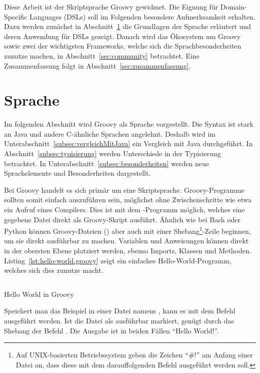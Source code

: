 \documentclass[a4paper]{article}
\newcommand{\outquote}[1]{``{#1}''}
\newcommand{\codelisting}[3]{\begin{listing}[htp]
	\inputminted{#1}{#1/#2}
	\vspace{-3ex}
	\caption{#3}
	\label{lst:#2}
\end{listing}}
\begin{document}
Diese Arbeit ist der Skriptsprache Groovy gewidmet.
Die Eignung für Domain-Specific Languages (DSLs) soll im Folgenden besondere Aufmerksamkeit erhalten.
Dazu werden zunächst in Abschnitt~\ref{sec:sprache} die Grundlagen der Sprache erläutert und deren Anwendung für DSLs gezeigt.
Danach wird das Ökosystem um Groovy sowie zwei der wichtigsten Frameworks, welche sich die Sprachbesonderheiten zunutze machen, in Abschnitt~\ref{sec:community} betrachtet.
Eine Zusammenfassung folgt in Abschnitt~\ref{sec:zusammenfassung}.


\section{Sprache}\label{sec:sprache}

Im folgenden Abschnitt wird Groovy als Sprache vorgestellt.
Die Syntax ist stark an Java und andere C-ähnliche Sprachen angelehnt.
Deshalb wird im Unterabschnitt~\ref{subsec:vergleichMitJava} ein Vergleich mit Java durchgeführt.
In Abschnitt~\ref{subsec:typisierung} werden Unterschiede in der Typisierung betrachtet.
In Unterabschnitt~\ref{subsec:besonderheiten} werden neue Sprachelemente und Besonderheiten dargestellt.

Bei Groovy handelt es sich primär um eine Skriptsprache.
Groovy-Programme sollten somit einfach auszuführen sein, möglichst ohne Zwischenschritte wie etwa ein Aufruf eines Compilers.
Dies ist mit dem -Programm möglich, welches eine gegebene Datei direkt als Groovy-Skript ausführt.
Ähnlich wie bei Bash oder Python können Groovy-Dateien () aber auch mit einer Shebang\footnote{Auf UNIX-basierten Betriebssystem geben die Zeichen ``\#!'' am Anfang einer Datei an, dass diese mit dem darauffolgenden Befehl ausgeführt werden soll.}-Zeile beginnen, um sie direkt ausführbar zu machen.
Variablen und Anweisungen können direkt in der obersten Ebene platziert werden, ebenso Imports, Klassen und Methoden.
Listing~\ref{lst:hello-world.groovy} zeigt ein einfaches Hello-World-Programm, welches sich dies zunutze macht.

\codelisting{groovy}{hello-world.groovy}{Hello World in Groovy}

Speichert man das Beispiel in einer Datei namens , kann es mit dem Befehl  ausgeführt werden.
Ist die Datei als ausführbar markiert, genügt durch das Shebang der Befehl .
Die Ausgabe ist in beiden Fällen \outquote{Hello World!}.
\end{document}
